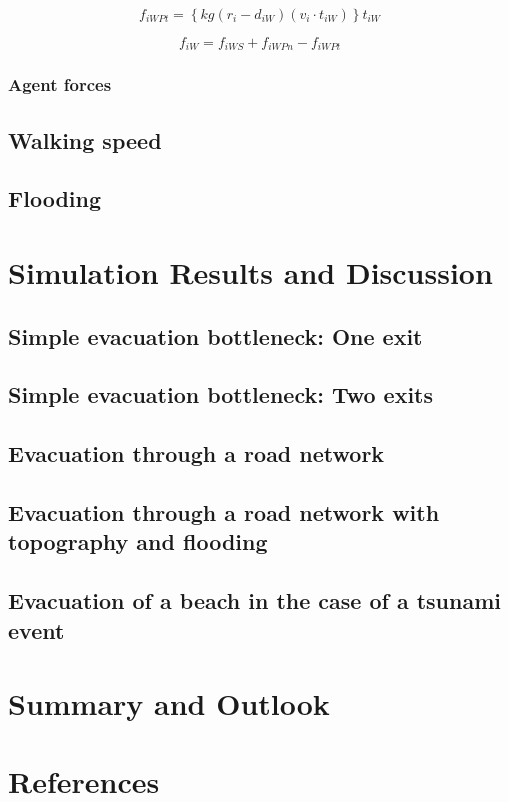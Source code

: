 \documentclass[11pt]{article}
\begin{document}
\begin{equation}
	{f_{iWPt}} = \left\{ {kg\left( {{r_i} - {d_{iW}}} \right)\left( {{v_i} \cdot {t_{iW}}} \right)} \right\}{t_{iW}}
	\label{eq:fiWPt}
\end{equation}

\begin{equation}
	{f_{iW}} = {f_{iWS}} + {f_{iWPn}} - {f_{iWPt}}
	\label{eq:fiW}
\end{equation}


\subsubsection{Agent forces}
\subsection{Walking speed}
\subsection{Flooding}


\section{Simulation Results and Discussion}
\subsection{Simple evacuation bottleneck: One exit}
\subsection{Simple evacuation bottleneck: Two exits}
\subsection{Evacuation through a road network}
\subsection{Evacuation through a road network with topography and flooding}
\subsection{Evacuation of a beach in the case of a tsunami event}

\section{Summary and Outlook}

\section{References}
\end{document}

